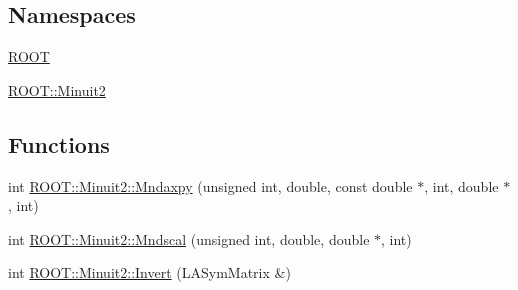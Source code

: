 \subsection*{Namespaces}
\begin{DoxyCompactItemize}
\item 
 \mbox{\hyperlink{namespaceROOT}{R\+O\+OT}}
\item 
 \mbox{\hyperlink{namespaceROOT_1_1Minuit2}{R\+O\+O\+T\+::\+Minuit2}}
\end{DoxyCompactItemize}
\subsection*{Functions}
\begin{DoxyCompactItemize}
\item 
int \mbox{\hyperlink{namespaceROOT_1_1Minuit2_a4784db8e0b280e76eb6f8b00e2b395dd}{R\+O\+O\+T\+::\+Minuit2\+::\+Mndaxpy}} (unsigned int, double, const double $\ast$, int, double $\ast$, int)
\item 
int \mbox{\hyperlink{namespaceROOT_1_1Minuit2_a8d430fbbb8b24669bd04e922230451ff}{R\+O\+O\+T\+::\+Minuit2\+::\+Mndscal}} (unsigned int, double, double $\ast$, int)
\item 
int \mbox{\hyperlink{namespaceROOT_1_1Minuit2_a3d7791001fe4298059c858771fba35db}{R\+O\+O\+T\+::\+Minuit2\+::\+Invert}} (L\+A\+Sym\+Matrix \&)
\end{DoxyCompactItemize}
